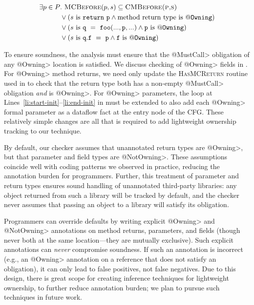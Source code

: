 \begin{align*}
  \exists p \in P &.\ \textsc{MCBefore}(p,s) \subseteq \textsc{CMBefore(p,s)}\\
                  &\vee (s \mathrm{\ is\ } \mathtt{return\ p} \wedge \mathrm{method\ return\ type\ is\ } \mathtt{@Owning})\\
                  &\vee (s \mathrm{\ is\ } \mathtt{q\ =\ foo(...,p,...)} \wedge \mathtt{p} \mathrm{\ is\ } \mathtt{@Owning})\\
                  &\vee (s \mathrm{\ is\ } \mathtt{q.f\ =\ p} \wedge \mathtt{f} \mathrm{\ is\ } \mathtt{@Owning})\\
\end{align*}

To ensure soundness, the analysis must ensure that the \<@MustCall> obligation
of any \<@Owning> location is satisfied.  We discuss checking of \<@Owning>
fields in .  For \<@Owning> method returns, we need only
update the \textsc{Has\-MCReturn} routine used in  to check that
the return type both has a non-empty \<@MustCall> obligation \emph{and} is
\<@Owning>.  For \<@Owning> parameters, the loop at
Lines~\ref{li:start-init}--\ref{li:end-init} in 
must be extended to also add each \<@Owning> formal parameter as a dataflow
fact at the entry node of the CFG.  These relatively simple changes are all that
is required to add lightweight ownership tracking to our technique.

By default, our checker assumes that unannotated return types are \<@Owning>,
but that parameter and field types are \<@NotOwning>.  These assumptions
coincide well with coding patterns we observed in practice, reducing the
annotation burden for programmers.  Further, this treatment of parameter and
return types ensures sound handling of unannotated third-party libraries: any
object returned from such a library will be tracked by default, and the checker
never assumes that passing an object to a library will satisfy its obligation.

Programmers can override defaults by writing explicit \<@Owning> and
\<@NotOwning> annotations on method returns, parameters, and fields
(though never both at the same location---they are
mutually exclusive).  Such explicit annotations can \emph{never}
compromise soundness.  If such an annotation is incorrect (e.g., an \<@Owning>
annotation on a reference that does not satisfy an obligation), it can only lead
to false positives, not false negatives.  Due to this design, there is great
scope for creating inference techniques for lightweight ownership, to further
reduce annotation burden; we plan to pursue such techniques in future work.

